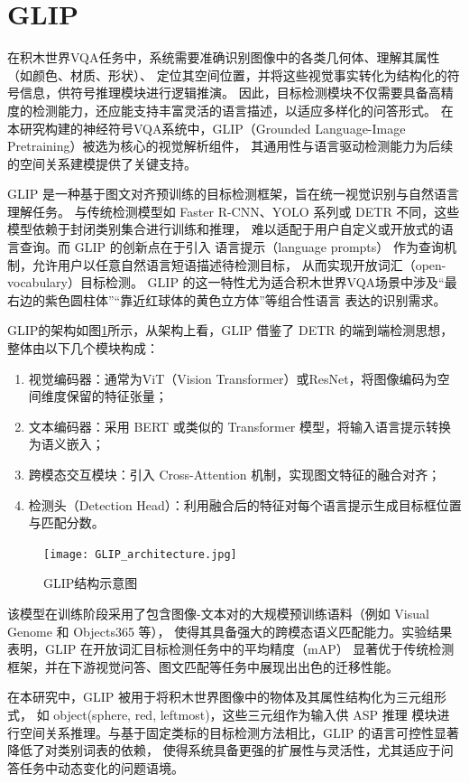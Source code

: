 \section{GLIP}
在积木世界VQA任务中，系统需要准确识别图像中的各类几何体、理解其属性（如颜色、材质、形状）、
定位其空间位置，并将这些视觉事实转化为结构化的符号信息，供符号推理模块进行逻辑推演。
因此，目标检测模块不仅需要具备高精度的检测能力，还应能支持丰富灵活的语言描述，以适应多样化的问答形式。
在本研究构建的神经符号VQA系统中，GLIP（Grounded Language-Image Pretraining）被选为核心的视觉解析组件，
其通用性与语言驱动检测能力为后续的空间关系建模提供了关键支持。

GLIP 是一种基于图文对齐预训练的目标检测框架，旨在统一视觉识别与自然语言理解任务。
与传统检测模型如 Faster R-CNN、YOLO 系列或 DETR 不同，这些模型依赖于封闭类别集合进行训练和推理，
难以适配于用户自定义或开放式的语言查询。而 GLIP 的创新点在于引入 语言提示（language prompts） 
作为查询机制，允许用户以任意自然语言短语描述待检测目标，
从而实现开放词汇（open-vocabulary）目标检测\cite{li2022grounded}。
GLIP 的这一特性尤为适合积木世界VQA场景中涉及“最右边的紫色圆柱体”“靠近红球体的黄色立方体”等组合性语言
表达的识别需求。

GLIP的架构如图\ref{GLIP_architecture}所示，从架构上看，GLIP 借鉴了 DETR 的端到端检测思想，整体由以下几个模块构成：
\begin{enumerate}[itemsep=0pt,parsep=0pt]
\item 视觉编码器：通常为ViT（Vision Transformer）或ResNet，将图像编码为空间维度保留的特征张量；
\item 文本编码器：采用 BERT 或类似的 Transformer 模型，将输入语言提示转换为语义嵌入；
\item 跨模态交互模块：引入 Cross-Attention 机制，实现图文特征的融合对齐；
\item 检测头（Detection Head）：利用融合后的特征对每个语言提示生成目标框位置与匹配分数。
\end{enumerate}
\begin{figure}[h]
    \centering
    \texttt{[image: GLIP\_architecture.jpg]}
    \caption{GLIP结构示意图\label{GLIP_architecture}}
\end{figure}

该模型在训练阶段采用了包含图像-文本对的大规模预训练语料（例如 Visual Genome 和 Objects365 等），
使得其具备强大的跨模态语义匹配能力。实验结果表明，GLIP 在开放词汇目标检测任务中的平均精度（mAP）
显著优于传统检测框架，并在下游视觉问答、图文匹配等任务中展现出出色的迁移性能\cite{li2022grounded}。

在本研究中，GLIP 被用于将积木世界图像中的物体及其属性结构化为三元组形式，
如 object(sphere, red, leftmost)，这些三元组作为输入供 ASP 推理
模块进行空间关系推理。与基于固定类标的目标检测方法相比，GLIP 的语言可控性显著降低了对类别词表的依赖，
使得系统具备更强的扩展性与灵活性，尤其适应于问答任务中动态变化的问题语境。

